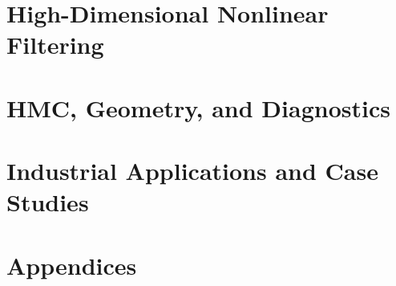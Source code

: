 \documentclass[12pt,a4paper,openany]{book}
\begin{document}
\part{High-Dimensional Nonlinear Filtering}










\part{HMC, Geometry, and Diagnostics}







\part{Industrial Applications and Case Studies}







\appendix
\part*{Appendices}








\backmatter


\end{document}
